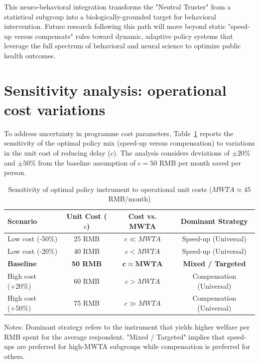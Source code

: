 \documentclass[doublespacing]{utdthesis}
\begin{document}
This neuro-behavioral integration transforms the "Neutral Truster" from a statistical subgroup into a biologically-grounded target for behavioral intervention. Future research following this path will move beyond static "speed-up versus compensate" rules toward dynamic, adaptive policy systems that leverage the full spectrum of behavioral and neural science to optimize public health outcomes.

\section{Sensitivity analysis: operational cost variations}
\label{sec:supp_essay3_sensitivity}

To address uncertainty in programme cost parameters, Table~\ref{tab:supp_sensitivity} reports the sensitivity of the optimal policy mix (speed-up versus compensation) to variations in the unit cost of reducing delay ($c$). The analysis considers deviations of $\pm 20\%$ and $\pm 50\%$ from the baseline assumption of $c=50$ RMB per month saved per person.

\begin{table}[htbp]
\centering
\caption{Sensitivity of optimal policy instrument to operational unit costs ($MWTA \approx 45$ RMB/month)}
\label{tab:supp_sensitivity}
\begin{threeparttable}
\begin{tabular}{lccc}
\toprule
Scenario & Unit Cost ($c$) & Cost vs. MWTA & Dominant Strategy \\
\midrule
Low cost (-50\%) & 25 RMB & $c \ll MWTA$ & Speed-up (Universal) \\
Low cost (-20\%) & 40 RMB & $c < MWTA$ & Speed-up (Universal) \\
\textbf{Baseline} & \textbf{50 RMB} & $\mathbf{c \approx MWTA}$ & \textbf{Mixed / Targeted} \\
High cost (+20\%) & 60 RMB & $c > MWTA$ & Compensation (Universal) \\
High cost (+50\%) & 75 RMB & $c \gg MWTA$ & Compensation (Universal) \\
\bottomrule
\end{tabular}
\begin{tablenotes}
\footnotesize
\item Notes: Dominant strategy refers to the instrument that yields higher welfare per RMB spent for the average respondent. "Mixed / Targeted" implies that speed-ups are preferred for high-MWTA subgroups while compensation is preferred for others.
\end{tablenotes}
\end{threeparttable}
\end{table}
\end{document}
